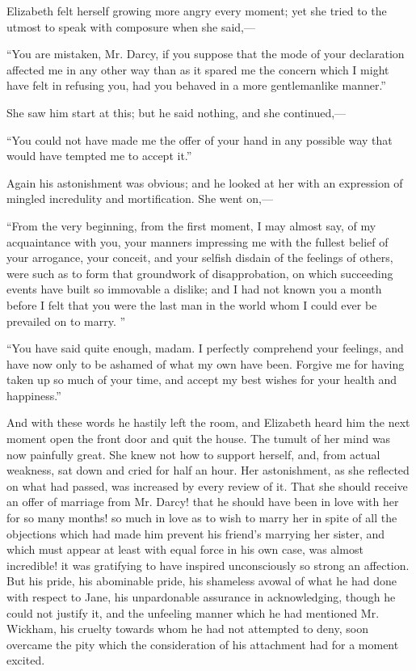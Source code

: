 \documentclass[10pt]{book}
\begin{document}
   Elizabeth felt herself growing more angry every moment; yet she tried to
the utmost to speak with composure when she said,—
  

   “You are mistaken, Mr. Darcy, if you suppose that the mode of your
declaration affected me in any other way than as it spared me the
concern which I might have felt in refusing you, had you behaved in a
more gentlemanlike manner.”
  

   She saw him start at this; but he said nothing, and she continued,—
  

   “You could not have made me the offer of your hand in any possible way
that would have tempted me to accept it.”
  

   Again his astonishment was obvious; and he looked at her with an
expression of mingled incredulity and mortification. She went on,—
  

   “From the very beginning, from the first moment, I may almost say, of my
acquaintance with you, your manners impressing me with the fullest
belief of your arrogance, your conceit, and your selfish disdain of the
feelings of others, were such as to form that groundwork of
disapprobation, on which succeeding events have built so immovable a
dislike; and I had not known you a month before I felt that you were the
last man in the world whom I could ever be prevailed on to marry.
   ”
  

   “You have said quite enough, madam. I perfectly comprehend your
feelings, and have now only to be ashamed of what my own have been.
Forgive me for having taken up so much of your time, and accept my best
wishes for your health and happiness.”
  

   And with these words he hastily left the room, and Elizabeth heard him
the next moment open the front door and quit the house. The tumult of
her mind was now painfully great. She knew not how to support herself,
and, from actual weakness, sat down and cried for half an hour. Her
astonishment, as she reflected on what had passed, was increased by
every review of it. That she should receive an offer of marriage from
Mr. Darcy! that he should have been in love with her for so many months!
so much in love as to wish to marry her in spite of all the objections
which had made him prevent his friend’s marrying her sister, and which
must appear at least with equal force in his own case, was almost
incredible! it was gratifying to have inspired unconsciously so strong
an affection. But his pride, his abominable pride, his shameless avowal
of what he had done with respect to Jane, his unpardonable assurance in
acknowledging, though he could not justify it, and the unfeeling manner
which he had mentioned Mr. Wickham, his cruelty towards whom he had not
attempted to deny, soon overcame the pity which the consideration of his
attachment had for a moment excited.
  
\end{document}
